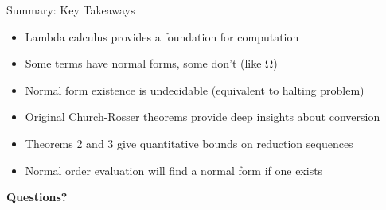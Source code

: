 \documentclass[10pt]{beamer}
\begin{document}
\begin{frame}{Summary: Key Takeaways}
\begin{itemize}
\item Lambda calculus provides a foundation for computation
\item Some terms have normal forms, some don't (like Ω)
\item Normal form existence is undecidable (equivalent to halting problem)
\item Original Church-Rosser theorems provide deep insights about conversion
\item Theorems 2 and 3 give quantitative bounds on reduction sequences
\item Normal order evaluation will find a normal form if one exists
\end{itemize}

\vspace{0.5cm}
\begin{center}
\textbf{Questions?}
\end{center}
\end{frame}
\end{document}
